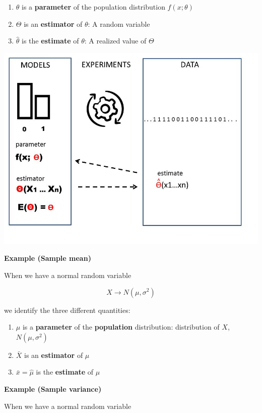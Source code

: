 \documentclass[
]{book}
\providecommand{\tightlist}{%
  \setlength{\itemsep}{0pt}\setlength{\parskip}{0pt}}
\begin{document}
\begin{enumerate}
\def\labelenumi{\arabic{enumi}.}
\tightlist
\item
  \(\theta\) is a \textbf{parameter} of the population distribution \(f(x; \theta)\)
\item
  \(\Theta\) is an \textbf{estimator} of \(\theta\): A random variable
\item
  \(\hat{\theta}\) is the \textbf{estimate} of \(\theta\): A realized value of \(\Theta\)
\end{enumerate}

\includegraphics{./figures/estimator.JPG}

\textbf{Example (Sample mean)}

When we have a normal random variable

\[X \rightarrow N(\mu, \sigma^2)\]

we identify the three different quantities:

\begin{enumerate}
\def\labelenumi{\arabic{enumi}.}
\tightlist
\item
  \(\mu\) is a \textbf{parameter} of the \textbf{population} distribution: distribution of \(X\), \(N(\mu, \sigma^2)\)
\item
  \(\bar{X}\) is an \textbf{estimator} of \(\mu\)
\item
  \(\bar{x}=\hat{\mu}\) is the \textbf{estimate} of \(\mu\)
\end{enumerate}

\textbf{Example (Sample variance)}

When we have a normal random variable
\end{document}
